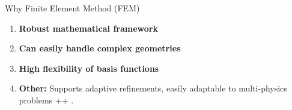 \begin{frame}
    \begin{block}{Why Finite Element Method (FEM)}
        \begin{enumerate}
            \item \textbf{Robust mathematical framework}
            \item \textbf{Can easily handle complex geometries}
            \item \textbf{High flexibility of basis functions}
            \item \textbf{Other: } Supports adaptive refinements, easily adaptable to multi-physics problems ++ .
        \end{enumerate}
    \end{block}
\end{frame}




